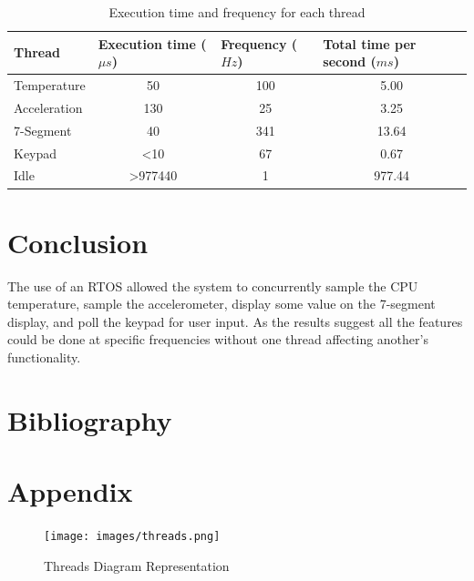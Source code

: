 \documentclass[12pt]{article}
\begin{document}
\begin{table}[!h]
\centering
\caption{Execution time and frequency for each thread}
\label{Table_threads}
\begin{tabular}{|l|c|c|c|}
\hline
\textbf{Thread} & \multicolumn{1}{l|}{\textbf{Execution time ($\mu s$)}} & \multicolumn{1}{l|}{\textbf{Frequency ($Hz$)}} & \multicolumn{1}{l|}{\textbf{Total time per second ($ms$)}} \\ \hline
Temperature & 50 & 100 & 5.00 \\ \hline
Acceleration & 130 & 25 & 3.25 \\ \hline
7-Segment & 40 & 341 & 13.64 \\ \hline
Keypad & \textless10 & 67 & 0.67 \\ \hline
Idle & \textgreater977440 & 1 & 977.44 \\ \hline
\end{tabular}
\end{table}

\newpage

\section{Conclusion}
The use of an RTOS allowed the system to concurrently sample the CPU temperature, sample the accelerometer, display some value on the 7-segment display, and poll the keypad for user input. As the results suggest all the features could be done at specific frequencies without one thread affecting another's functionality.

\newpage
\section{Bibliography}



\newpage
\section{Appendix}
\begin{figure}[!htb]
 \centering
 \texttt{[image: images/threads.png]}
 \caption{Threads Diagram Representation}
 \label{fig:threads}
\end{figure}
\end{document}

